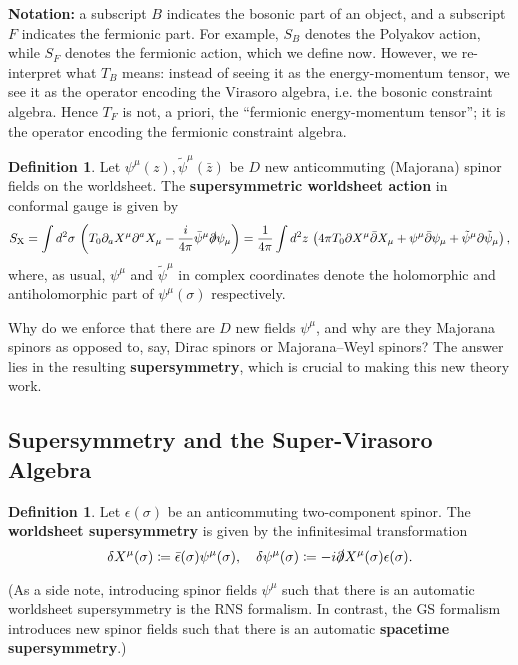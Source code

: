 \documentclass{report}
\theoremstyle{plain}
\theoremstyle{definition}
\newtheorem{definition}[theorem]{Definition}
\theoremstyle{remark}
\newcommand{\di}{\partial}
\newcommand{\bz}{\bar{z}}
\newcommand{\bdi}{\bar{\di}}
\begin{document}
{\bf Notation:} a subscript $B$ indicates the bosonic part of an
object, and a subscript $F$ indicates the fermionic part. For example,
$S_B$ denotes the Polyakov action, while $S_F$ denotes the fermionic
action, which we define now. However, we re-interpret what $T_B$
means: instead of seeing it as the energy-momentum tensor, we see it
as the operator encoding the Virasoro algebra, i.e. the bosonic
constraint algebra. Hence $T_F$ is not, a priori, the ``fermionic
energy-momentum tensor''; it is the operator encoding the fermionic
constraint algebra.

\begin{definition}
  Let $\psi^\mu(z), \tilde{\psi}^\mu(\bz)$ be $D$ new anticommuting
  (Majorana) spinor fields on the worldsheet. The {\bf supersymmetric
    worldsheet action} in conformal gauge is given by
  \[ S_{\text{X}} = \int d^2\sigma \, \left(T_0 \di_a X^\mu \di^a X_\mu - \frac{i}{4\pi}\bar{\psi}^\mu \slashed{\di} \psi_\mu\right) = \frac{1}{4\pi}\int d^2z \, \left(4\pi T_0\di X^\mu \bdi X_\mu + \psi^\mu \bdi \psi_\mu + \tilde{\psi}^\mu \di \tilde{\psi}_\mu\right), \]
  where, as usual, $\psi^\mu$ and $\tilde{\psi}^\mu$ in complex
  coordinates denote the holomorphic and antiholomorphic part of
  $\psi^\mu(\sigma)$ respectively.
\end{definition}

Why do we enforce that there are $D$ new fields $\psi^\mu$, and why
are they Majorana spinors as opposed to, say, Dirac spinors or
Majorana--Weyl spinors? The answer lies in the resulting {\bf
  supersymmetry}, which is crucial to making this new theory work.

\subsection{Supersymmetry and the Super-Virasoro Algebra}

\begin{definition}
  Let $\epsilon(\sigma)$ be an anticommuting two-component spinor. The
  {\bf worldsheet supersymmetry} is given by the infinitesimal
  transformation
  \[ \delta X^\mu(\sigma) \coloneqq \bar{\epsilon}(\sigma) \psi^\mu(\sigma), \quad \delta \psi^\mu(\sigma) \coloneqq -i \slashed{\di} X^\mu(\sigma) \epsilon(\sigma). \]
\end{definition}

(As a side note, introducing spinor fields $\psi^\mu$ such that there
is an automatic worldsheet supersymmetry is the RNS formalism. In
contrast, the GS formalism introduces new spinor fields such that
there is an automatic {\bf spacetime supersymmetry}.)
\end{document}
